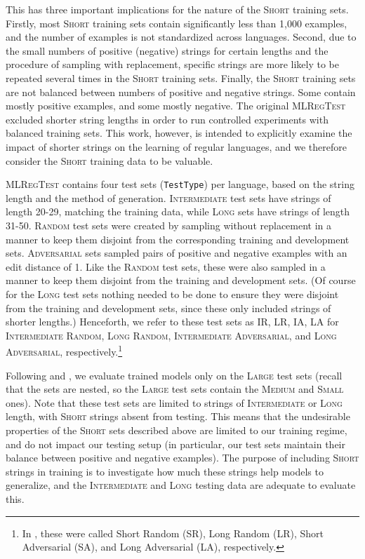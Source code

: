 \documentclass[twoside,11pt]{article}
\newcommand{\tscx}[1]{\textsc{#1}\xspace}
\newcommand{\ttt}[1]{\texttt{#1}}
\newcommand{\tttx}[1]{\ttt{#1}\xspace}
\newcommand{\TestType}{\tttx{TestType}}
\newcommand{\sm}{\tscx{Small}}
\newcommand{\med}{\tscx{Medium}}
\newcommand{\lrg}{\tscx{Large}}
\newcommand{\short}{\tscx{Short}}
\newcommand{\orig}{\tscx{Intermediate}}
\newcommand{\lng}{\tscx{Long}}
\newcommand{\origRandFull}{\tscx{Intermediate Random}}
\newcommand{\origRand}{IR\xspace}
\newcommand{\longRandFull}{\tscx{Long Random}}
\newcommand{\longRand}{LR\xspace}
\newcommand{\origAdvFull}{\tscx{Intermediate Adversarial}}
\newcommand{\origAdv}{IA\xspace}
\newcommand{\longAdvFull}{\tscx{Long Adversarial}}
\newcommand{\longAdv}{LA\xspace}
\begin{document}
This has three important implications for the nature of the \short training sets.
Firstly, most \short training sets contain significantly less than 1,000 examples, and the number of examples is not standardized across languages.
Second, due to the small numbers of positive (negative) strings for certain lengths and the procedure of sampling with replacement, specific strings are more likely to be repeated several times in the \short training sets.
Finally, the \short training sets are not balanced between numbers of positive and negative strings.
Some contain mostly positive examples, and some mostly negative.
The original \textsc{MLRegTest} excluded shorter string lengths in order to run controlled experiments with balanced training sets.
This work, however, is intended to explicitly examine the impact of shorter strings on the learning of regular languages, and we therefore consider the \short training data to be valuable.

\textsc{MLRegTest} contains four test sets (\TestType) per language, based on the
string length and the method of generation. 
\orig{} test sets have strings of length 20-29, matching the training data, while \lng{} sets have strings of length
31-50. 
\textsc{Random} test sets were created by sampling without replacement in a manner to keep them disjoint from the corresponding training and development sets. 
\textsc{Adversarial} sets sampled pairs of positive and negative examples with an edit distance of 1. 
Like the \textsc{Random} test sets, these were also sampled in a manner to keep them disjoint from the training and
development sets. 
(Of course for the \lng{} test sets nothing
needed to be done to ensure they were disjoint from the training and
development sets, since these only included strings of shorter lengths.)
Henceforth, we refer to these test sets as \origRand, \longRand, \origAdv, \longAdv for \textsc{\origRandFull, \longRandFull, \origAdvFull}, and \textsc{\longAdvFull}, respectively.\footnote{In \citet{mlregtest}, these were called Short Random (SR), Long Random (LR), Short Adversarial (SA), and Long Adversarial (LA), respectively.}

Following \citet{mlregtest} and \citet{adil23}, we evaluate trained models only on the \lrg test sets (recall that the sets are nested, so the \lrg test sets contain the \med and \sm ones).
Note that these test sets are limited to strings of \orig or \lng length, with \short strings absent from testing.
This means that the undesirable properties of the \short sets described above are limited to our training regime, and do not impact our testing setup (in particular, our test sets maintain their balance between positive and negative examples).
The purpose of including \short strings in training is to investigate how much these strings help models to generalize, and the \orig{} and \lng{} testing data are adequate to evaluate this.
\end{document}
